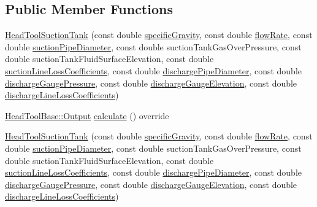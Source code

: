 \subsection*{Public Member Functions}
\begin{DoxyCompactItemize}
\item 
\hyperlink{class_head_tool_suction_tank_a96579ecd414c723362db00cfeb24cd46}{Head\+Tool\+Suction\+Tank} (const double \hyperlink{class_head_tool_base_ae5af2380fb5db2c25281ef663a5fb65f}{specific\+Gravity}, const double \hyperlink{class_head_tool_base_acf4c03cb62cbf63aba017ce063989fbc}{flow\+Rate}, const double \hyperlink{class_head_tool_base_a357365fc5ef346ce7bcb089c9d1a95e1}{suction\+Pipe\+Diameter}, const double suction\+Tank\+Gas\+Over\+Pressure, const double suction\+Tank\+Fluid\+Surface\+Elevation, const double \hyperlink{class_head_tool_base_ac74c6f6f8ab387efe7b77e0ce6ecd84e}{suction\+Line\+Loss\+Coefficients}, const double \hyperlink{class_head_tool_base_a126a397bd3d87b68864e1962c70bb45e}{discharge\+Pipe\+Diameter}, const double \hyperlink{class_head_tool_base_a39c854f13b16967e02a67cd1aaee07c4}{discharge\+Gauge\+Pressure}, const double \hyperlink{class_head_tool_base_a9ed2160992f8da2e335d919cf9aedd08}{discharge\+Gauge\+Elevation}, const double \hyperlink{class_head_tool_base_a147c035c7422406c594c5fd42ab11eb0}{discharge\+Line\+Loss\+Coefficients})
\item 
\hyperlink{struct_head_tool_base_1_1_output}{Head\+Tool\+Base\+::\+Output} \hyperlink{class_head_tool_suction_tank_ad91b31b9f524b9892da26e5ecb9e191e}{calculate} () override
\item 
\hyperlink{class_head_tool_suction_tank_a96579ecd414c723362db00cfeb24cd46}{Head\+Tool\+Suction\+Tank} (const double \hyperlink{class_head_tool_base_ae5af2380fb5db2c25281ef663a5fb65f}{specific\+Gravity}, const double \hyperlink{class_head_tool_base_acf4c03cb62cbf63aba017ce063989fbc}{flow\+Rate}, const double \hyperlink{class_head_tool_base_a357365fc5ef346ce7bcb089c9d1a95e1}{suction\+Pipe\+Diameter}, const double suction\+Tank\+Gas\+Over\+Pressure, const double suction\+Tank\+Fluid\+Surface\+Elevation, const double \hyperlink{class_head_tool_base_ac74c6f6f8ab387efe7b77e0ce6ecd84e}{suction\+Line\+Loss\+Coefficients}, const double \hyperlink{class_head_tool_base_a126a397bd3d87b68864e1962c70bb45e}{discharge\+Pipe\+Diameter}, const double \hyperlink{class_head_tool_base_a39c854f13b16967e02a67cd1aaee07c4}{discharge\+Gauge\+Pressure}, const double \hyperlink{class_head_tool_base_a9ed2160992f8da2e335d919cf9aedd08}{discharge\+Gauge\+Elevation}, const double \hyperlink{class_head_tool_base_a147c035c7422406c594c5fd42ab11eb0}{discharge\+Line\+Loss\+Coefficients})

\end{DoxyCompactItemize}
